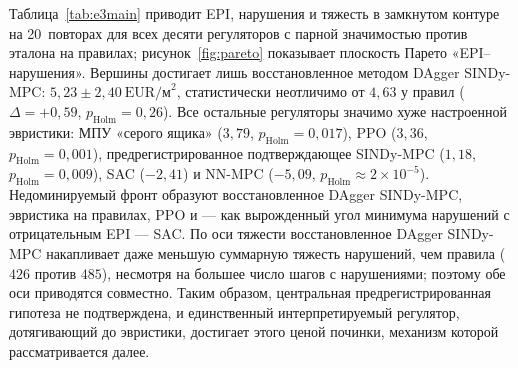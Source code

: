\documentclass[preprint,3p]{elsarticle}
\begin{document}
Таблица~\ref{tab:e3main} приводит EPI, нарушения и тяжесть в замкнутом контуре на 20~повторах
для всех десяти регуляторов с парной значимостью против эталона на правилах;
рисунок~\ref{fig:pareto} показывает плоскость Парето «EPI--нарушения». Вершины достигает лишь
восстановленное методом DAgger SINDy-MPC: $5{,}23\pm2{,}40~\text{EUR/м}^2$, статистически
неотличимо от $4{,}63$ у правил ($\Delta=+0{,}59$, $p_{\text{Holm}}=0{,}26$). Все остальные
регуляторы значимо хуже настроенной эвристики: МПУ «серого ящика» ($3{,}79$,
$p_{\text{Holm}}=0{,}017$), PPO ($3{,}36$, $p_{\text{Holm}}=0{,}001$), предрегистрированное
подтверждающее SINDy-MPC ($1{,}18$, $p_{\text{Holm}}=0{,}009$), SAC ($-2{,}41$) и NN-MPC
($-5{,}09$, $p_{\text{Holm}}\approx2\times10^{-5}$). Недоминируемый фронт образуют
восстановленное DAgger SINDy-MPC, эвристика на правилах, PPO и — как вырожденный угол минимума
нарушений с отрицательным EPI — SAC. По оси тяжести восстановленное DAgger SINDy-MPC
накапливает даже меньшую суммарную тяжесть нарушений, чем правила ($426$ против $485$),
несмотря на большее число шагов с нарушениями; поэтому обе оси приводятся совместно. Таким
образом, центральная предрегистрированная гипотеза не подтверждена, и единственный
интерпретируемый регулятор, дотягивающий до эвристики, достигает этого ценой починки,
механизм которой рассматривается далее.
\end{document}
